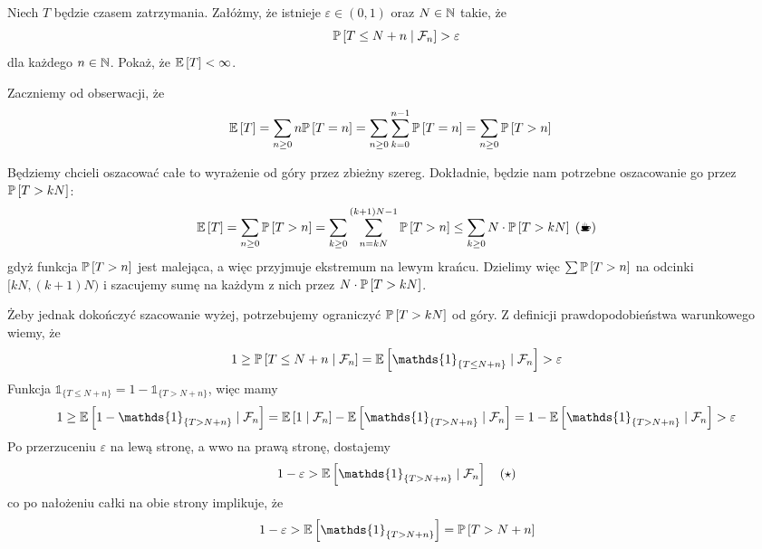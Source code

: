 \begin{problem}
  Niech $T$ będzie czasem zatrzymania. Załóżmy, że istnieje $\varepsilon\in(0,1)$ oraz $N\in\operatorname{\mathbb{N}}$ takie, że
  $$\prob{T\leq N+n}{\set{F}_n}>\varepsilon$$
  dla każdego $n\in\operatorname{\mathbb{N}}$. Pokaż, że $\expected{T}<\infty$.
\end{problem}

\begin{solution}
  Zaczniemy od obserwacji, że
  \begin{align*}
    \expected{T}&=\sum_{n\geq0}n\prob{T=n}=\sum_{n\geq0}\sum_{k=0}^{n-1}\prob{T=n}=\sum_{n\geq0}\prob{T>n}
  \end{align*}
  \begin{center}\end{center}
  Będziemy chcieli oszacować całe to wyrażenie od góry przez zbieżny szereg. Dokładnie, będzie nam potrzebne oszacowanie go przez $\prob{T>kN}$:
  $$\expected{T}=\sum_{n\geq 0}\prob{T>n}=\sum_{k\geq 0}\sum_{n=kN}^{(k+1)N-1}\prob{T>n}\leq \sum_{k\geq 0}N\cdot\prob{T>kN}\;(\text{\Coffeecup})$$
  gdyż funkcja $\prob{T>n}$ jest malejąca, a więc przyjmuje ekstremum na lewym krańcu. Dzielimy więc $\sum\prob{T>n}$ na odcinki $[kN, (k+1)N)$ i szacujemy sumę na każdym z nich przez $N\cdot \prob{T>kN}$.

  Żeby jednak dokończyć szacowanie wyżej, potrzebujemy ograniczyć $\prob{T>kN}$ od góry. Z definicji prawdopodobieństwa warunkowego wiemy, że
  $$1\geq\prob{T\leq N+n}{\set{F}_n}=\expected{\mathds{1}_{\{T\leq N+n\}}}{\set{F}_n}>\varepsilon$$
  Funkcja $\mathds{1}_{\{T\leq N+n\}}=1-\mathds{1}_{\{T>N+n\}}$, więc mamy
  $$1\geq \expected{1-\mathds{1}_{\{T>N+n\}}}{\set{F}_n}=\expected{1}{\set{F}_n}-\expected{\mathds{1}_{\{T>N+n\}}}{\set{F}_n}=1-\expected{\mathds{1}_{\{T>N+n\}}}{\set{F}_n}>\varepsilon$$
  Po przerzuceniu $\varepsilon$ na lewą stronę, a wwo na prawą stronę, dostajemy
  $$1-\varepsilon > \expected{\mathds{1}_{\{T>N+n\}}}{\set{F}_n}\quad(\star)$$
  co po nałożeniu całki na obie strony implikuje, że
  $$1-\varepsilon>\expected{\mathds{1}_{\{T>N+n\}}}=\prob{T>N+n}$$


\end{solution}
